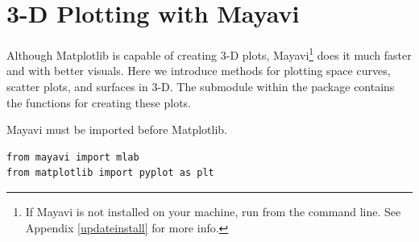 
\section*{3-D Plotting with Mayavi} %

Although Matplotlib is capable of creating 3-D plots, Mayavi\footnote{If Mayavi is not installed on your machine, run  from the command line. See Appendix \ref{updateinstall} for more info.} does it much faster and with better visuals.
Here we introduce methods for plotting space curves, scatter plots, and surfaces in 3-D.
The  submodule within the  package contains the functions for creating these plots.

\begin{warn}
Mayavi must be imported before Matplotlib.
\begin{lstlisting}
from mayavi import mlab
from matplotlib import pyplot as plt
\end{lstlisting}
\end{warn}

